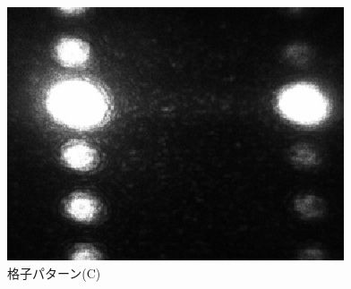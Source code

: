 \documentclass[11pt,a4]{jarticle}
\begin{document}
\begin{figure}[htbp]
\begin{minipage}{0.33\hsize}
\begin{center}
     \label{fig:TypeB}
   \end{center}
 \end{minipage}
  \begin{minipage}{0.33\hsize}
   \begin{center}
    \includegraphics[width=0.9\hsize]{./TypeC.eps}
    \caption{格子パターン(C)}
     \label{fig:TypeC}
   \end{center}
 \end{minipage}
\end{figure}
\end{document}
